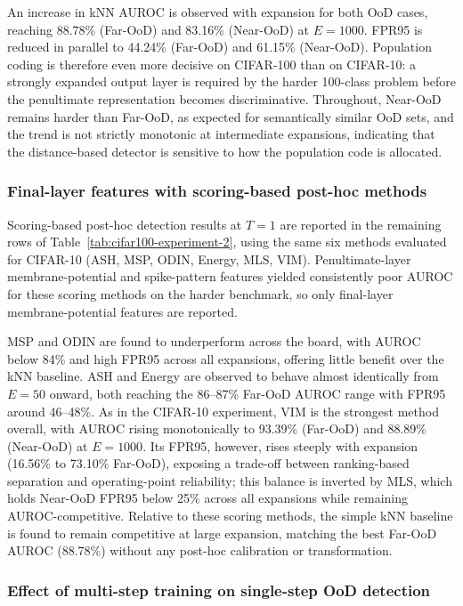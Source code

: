 \documentclass{ieeeaccess}
\begin{document}
An increase in kNN AUROC is observed with expansion for both OoD cases, reaching 88.78\% (Far-OoD) and 83.16\% (Near-OoD) at $E=1000$. FPR95 is reduced in parallel to 44.24\% (Far-OoD) and 61.15\% (Near-OoD). Population coding is therefore even more decisive on CIFAR-100 than on CIFAR-10: a strongly expanded output layer is required by the harder 100-class problem before the penultimate representation becomes discriminative. Throughout, Near-OoD remains harder than Far-OoD, as expected for semantically similar OoD sets, and the trend is not strictly monotonic at intermediate expansions, indicating that the distance-based detector is sensitive to how the population code is allocated.

\subsubsection*{Final-layer features with scoring-based post-hoc methods}

Scoring-based post-hoc detection results at $T=1$ are reported in the remaining rows of Table~\ref{tab:cifar100-experiment-2}, using the same six methods evaluated for CIFAR-10 (ASH, MSP, ODIN, Energy, MLS, VIM). Penultimate-layer membrane-potential and spike-pattern features yielded consistently poor AUROC for these scoring methods on the harder benchmark, so only final-layer membrane-potential features are reported.

MSP and ODIN are found to underperform across the board, with AUROC below 84\% and high FPR95 across all expansions, offering little benefit over the kNN baseline. ASH and Energy are observed to behave almost identically from $E=50$ onward, both reaching the 86--87\% Far-OoD AUROC range with FPR95 around 46--48\%. As in the CIFAR-10 experiment, VIM is the strongest method overall, with AUROC rising monotonically to 93.39\% (Far-OoD) and 88.89\% (Near-OoD) at $E=1000$. Its FPR95, however, rises steeply with expansion (16.56\% to 73.10\% Far-OoD), exposing a trade-off between ranking-based separation and operating-point reliability; this balance is inverted by MLS, which holds Near-OoD FPR95 below 25\% across all expansions while remaining AUROC-competitive. Relative to these scoring methods, the simple kNN baseline is found to remain competitive at large expansion, matching the best Far-OoD AUROC (88.78\%) without any post-hoc calibration or transformation.

\subsubsection*{Effect of multi-step training on single-step OoD detection}
\end{document}
